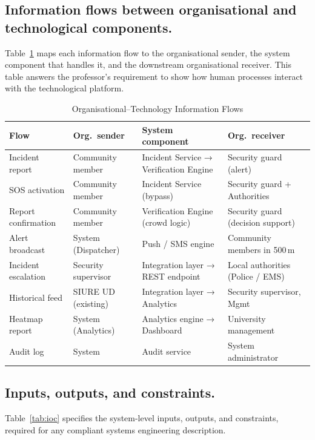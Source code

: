 \documentclass[12pt,a4paper]{article}
\begin{document}
\subsection{Information flows between organisational and technological components.}
Table~\ref{tab:infoflow} maps each information flow to the
organisational sender, the system component that handles it, and the
downstream organisational receiver. This table answers the professor's
requirement to show how human processes interact with the technological
platform.

\begin{table}[h]
\caption{Organisational--Technology Information Flows}
\label{tab:infoflow}
\centering
\begin{tabularx}{\textwidth}{lXXX}
\toprule
\textbf{Flow} & \textbf{Org.\ sender} & \textbf{System component} & \textbf{Org.\ receiver} \\
\midrule
Incident report & Community member & Incident Service → Verification Engine & Security guard (alert) \\
SOS activation & Community member & Incident Service (bypass) & Security guard + Authorities \\
Report confirmation & Community member & Verification Engine (crowd logic) & Security guard (decision support) \\
Alert broadcast & System (Dispatcher) & Push / SMS engine & Community members in 500\,m \\
Incident escalation & Security supervisor & Integration layer → REST endpoint & Local authorities (Police / EMS) \\
Historical feed & SIURE UD (existing) & Integration layer → Analytics & Security supervisor, Mgmt \\
Heatmap report & System (Analytics) & Analytics engine → Dashboard & University management \\
Audit log & System & Audit service & System administrator \\
\bottomrule
\end{tabularx}
\end{table}

\subsection{Inputs, outputs, and constraints.}
Table~\ref{tab:ioc} specifies the system-level inputs, outputs, and
constraints, required for any compliant systems engineering description.
\end{document}
